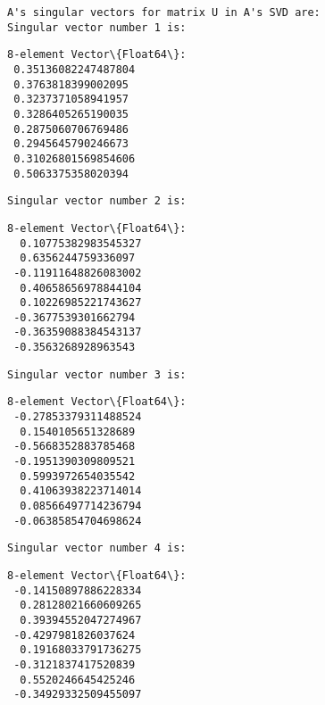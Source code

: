 \documentclass[11pt]{article}
\begin{document}
    
    \begin{Verbatim}[commandchars=\\\{\}]
A's singular vectors for matrix U in A's SVD are:
Singular vector number 1 is:
    \end{Verbatim}

    
    \begin{Verbatim}[commandchars=\\\{\}]
8-element Vector\{Float64\}:
 0.35136082247487804
 0.3763818399002095
 0.3237371058941957
 0.3286405265190035
 0.2875060706769486
 0.2945645790246673
 0.31026801569854606
 0.5063375358020394
    \end{Verbatim}

    
    \begin{Verbatim}[commandchars=\\\{\}]
Singular vector number 2 is:
    \end{Verbatim}

    
    \begin{Verbatim}[commandchars=\\\{\}]
8-element Vector\{Float64\}:
  0.10775382983545327
  0.6356244759336097
 -0.11911648826083002
  0.40658656978844104
  0.10226985221743627
 -0.3677539301662794
 -0.36359088384543137
 -0.3563268928963543
    \end{Verbatim}

    
    \begin{Verbatim}[commandchars=\\\{\}]
Singular vector number 3 is:
    \end{Verbatim}

    
    \begin{Verbatim}[commandchars=\\\{\}]
8-element Vector\{Float64\}:
 -0.27853379311488524
  0.1540105651328689
 -0.5668352883785468
 -0.1951390309809521
  0.5993972654035542
  0.41063938223714014
  0.08566497714236794
 -0.06385854704698624
    \end{Verbatim}

    
    \begin{Verbatim}[commandchars=\\\{\}]
Singular vector number 4 is:
    \end{Verbatim}

    
    \begin{Verbatim}[commandchars=\\\{\}]
8-element Vector\{Float64\}:
 -0.14150897886228334
  0.28128021660609265
  0.39394552047274967
 -0.4297981826037624
  0.19168033791736275
 -0.3121837417520839
  0.5520246645425246
 -0.34929332509455097
    \end{Verbatim}
\end{document}
